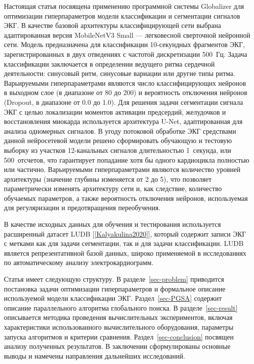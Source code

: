 \documentclass[10pt,a4paper]{book}
\begin{document}
Настоящая статья посвящена применению программной системы Globalizer для оптимизации гиперпараметров модели классификации и сегментации сигналов ЭКГ. В качестве базовой архитектуры классифицирующей сети выбрана адаптированная версия MobileNetV3 Small --- легковесной сверточной нейронной сети. Модель предназначена для классификации 10-секундных фрагментов ЭКГ, зарегистрированных в двух отведениях с частотой дискретизации 500~Гц. Задача классификации заключается в определении ведущего ритма сердечной деятельности: синусовый ритм, синусовые вариации или другие типы ритма. Варьируемыми гиперпараметрами являются число классифицирующих нейронов в выходном слое (в диапазоне от 80 до 200) и вероятность отключения нейронов (Dropout, в диапазоне от 0.0 до 1.0). Для решения задачи сегментации сигнала ЭКГ с целью локализации моментов активации предсердий, желудочков и восстановления миокарда используется архитектура U-Net, адаптированная для анализа одномерных сигналов. В угоду потоковой обработке ЭКГ средствами данной нейросетевой модели решено сформировать обучающую и тестовую выборку из участков 12-канальных сигналов длительностью 1~секунда, или 500~отсчетов, что гарантирует попадание хотя бы одного кардиоцикла полностью или частично. Варьируемыми гиперпараметрами являются количество уровней архитектуры (значение глубины изменяется от 2 до 5), что позволяет параметрически изменять архитектуру сети и, как следствие, количество обучаемых параметров, а также вероятность отключения нейронов, используемая для регуляризации и предотвращения переобучения.

В качестве исходных данных для обучения и тестирования используется расширенный датасет LUDB [\ref{Kalyakulina2020}], который содержит записи ЭКГ с метками как для задачи сегментации, так и для задачи классификации. LUDB является репрезентативной базой данных, широко применяемой в исследованиях по автоматическому анализу электрокардиограмм.

Статья имеет следующую структуру. В разделе~\ref{sec-problem} приводится постановка задачи оптимизации гиперпараметров и формальное описание используемой модели классификации ЭКГ. Раздел~\ref{sec-PGSA} содержит описание параллельного алгоритма глобального поиска. В разделе~\ref{sec-result} описывается методика проведения вычислительных экспериментов, включая характеристики использованного вычислительного оборудования, параметры запуска алгоритмов и критерии сравнения. Раздел~\ref{sec-conclusion} посвящен анализу полученных результатов. В заключении сформулированы основные выводы и намечены направления дальнейших исследований.
\end{document}
